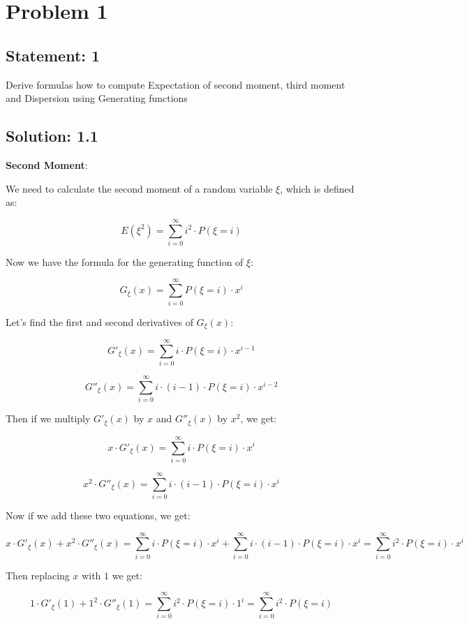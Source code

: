 \section*{Problem 1}

\subsection*{Statement: 1}

Derive formulas how to compute Expectation of second moment, third moment and Dispersion using Generating functions

\subsection*{Solution: 1.1}

\textbf{Second Moment}:

We need to calculate the second moment of a random variable \( \xi \), which is defined as:

\[ E(\xi^2) = \sum_{i=0}^{\infty} i^2 \cdot P(\xi = i) \]

Now we have the formula for the generating function of \( \xi \):

\[ G_{\xi}(x) = \sum_{i=0}^{\infty} P(\xi = i) \cdot x^i \]

Let's find the first and second derivatives of \( G_{\xi}(x) \):


\[ G'_{\xi}(x) = \sum_{i=0}^{\infty} i \cdot P(\xi = i) \cdot x^{i-1} \]

\[ G''_{\xi}(x) = \sum_{i=0}^{\infty} i \cdot (i-1) \cdot P(\xi = i) \cdot x^{i-2} \]

Then if we multiply \( G'_\xi(x) \) by \( x \) and \( G''_\xi(x) \) by \( x^2 \), we get:

\[ x \cdot G'_{\xi}(x) = \sum_{i=0}^{\infty} i \cdot P(\xi = i) \cdot x^{i} \]

\[ x^2 \cdot G''_{\xi}(x) = \sum_{i=0}^{\infty} i \cdot (i-1) \cdot P(\xi = i) \cdot x^{i} \]

Now if we add these two equations, we get:

\[ x \cdot G'_{\xi}(x) + x^2 \cdot G''_{\xi}(x) = \sum_{i=0}^{\infty} i \cdot P(\xi = i) \cdot x^{i} + \sum_{i=0}^{\infty} i \cdot (i-1) \cdot P(\xi = i) \cdot x^{i} = \sum_{i=0}^{\infty} i^2 \cdot P(\xi = i) \cdot x^{i} \]

Then replacing $x$ with $1$ we get:

\[ 1 \cdot G'_{\xi}(1) + 1^2 \cdot G''_{\xi}(1) = \sum_{i=0}^{\infty} i^2 \cdot P(\xi = i) \cdot 1^{i} = \sum_{i=0}^{\infty} i^2 \cdot P(\xi = i) \]

